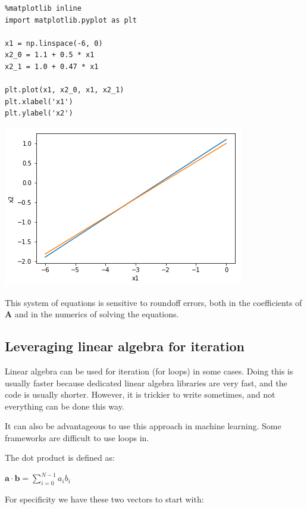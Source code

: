 \documentclass[11pt]{article}
\begin{document}
\begin{verbatim}
%matplotlib inline
import matplotlib.pyplot as plt

x1 = np.linspace(-6, 0)
x2_0 = 1.1 + 0.5 * x1
x2_1 = 1.0 + 0.47 * x1

plt.plot(x1, x2_0, x1, x2_1)
plt.xlabel('x1')
plt.ylabel('x2')
\end{verbatim}

\begin{center}
\includegraphics[width=.9\linewidth]{obipy-resources/b5b04848a67295fc27e39527fe8a7f38-35028b2T.png}
\end{center}

This system of equations is sensitive to roundoff errors, both in the coefficients of \(\mathbf{A}\) and in the numerics of solving the equations.
\subsection{Leveraging linear algebra for iteration}
\label{sec:org016edc8}

Linear algebra can be used for iteration (for loops) in some cases. Doing this is usually faster because dedicated linear algebra libraries are very fast, and the code is usually shorter. However, it is trickier to write sometimes, and not everything can be done this way.

It can also be advantageous to use this approach in machine learning. Some frameworks are difficult to use loops in.

The dot product is defined as:

\(\mathbf{a}\cdot\mathbf{b} = \sum_{i=0}^{N-1} a_i b_i\)

For specificity we have these two vectors to start with:
\end{document}
